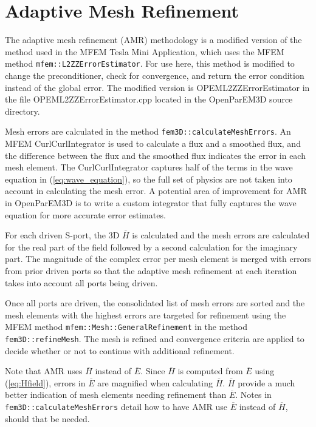 \documentclass[titlepage]{article}
\renewcommand\_{\textunderscore\linebreak[1]}
\begin{document}
\section{Adaptive Mesh Refinement}

The adaptive mesh refinement (AMR) methodology is a modified version of the method used in the MFEM Tesla Mini Application, which uses the MFEM method \texttt{mfem::L2ZZErrorEstimator}. For use here, this method is modified to change the preconditioner, check for convergence, and return the error condition instead of the global error. The modified version is OPEM\_L2ZZErrorEstimator in the file OPEM\_L2ZZErrorEstimator.cpp located in the OpenParEM3D source directory.

Mesh errors are calculated in the method \texttt{fem3D::calculateMeshErrors}.  An MFEM CurlCurlIntegrator is used to calculate a flux and a smoothed flux, and the difference between the flux and the smoothed flux indicates the error in each mesh element. The CurlCurlIntegrator captures half of the terms in the wave equation in (\ref{eq:wave_equation}), so the full set of physics are not taken into account in calculating the mesh error.  A potential area of improvement for AMR in OpenParEM3D is to write a custom integrator that fully captures the wave equation for more accurate error estimates.

For each driven S-port, the 3D $\overline{H}$ is calculated and the mesh errors are calculated for the real part of the field followed by a second calculation for the imaginary part.  The magnitude of the complex error per mesh element is merged with errors from prior driven ports so that the adaptive mesh refinement at each iteration takes into account all ports being driven.

Once all ports are driven, the consolidated list of mesh errors are sorted and the mesh elements with the highest errors are targeted for refinement using the MFEM method \texttt{mfem::Mesh::GeneralRefinement} in the method \texttt{fem3D::refineMesh}.  The mesh is refined and convergence criteria are applied to decide whether or not to continue with additional refinement. 

Note that AMR uses $\overline{H}$ instead of $\overline{E}$. Since $\overline{H}$ is computed from $\overline{E}$ using (\ref{eq:Hfield}), errors in $\overline{E}$ are magnified when calculating $\overline{H}$.  $\overline{H}$ provide a much better indication of mesh elements needing refinement than $\overline{E}$.  Notes in \texttt{fem3D::calculateMeshErrors} detail how to have AMR use $\overline{E}$ instead of $\overline{H}$, should that be needed.
\end{document}
